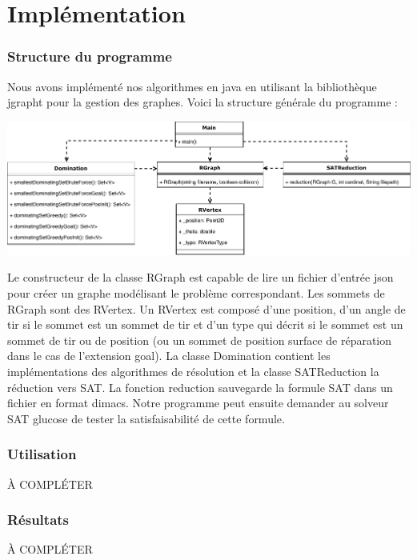 \part{Implémentation}

\section{Structure du programme}
Nous avons implémenté nos algorithmes en java en utilisant la bibliothèque jgrapht pour la gestion des graphes. Voici la structure générale du programme :\newline

\scalebox{0.7} {
\includegraphics{robotdef.pdf}
} \newline

Le constructeur de la classe RGraph est capable de lire un fichier d'entrée json pour créer un graphe modélisant le problème correspondant. Les sommets de RGraph sont des RVertex. Un RVertex est composé d'une position, d'un angle de tir si le sommet est un sommet de tir et d'un type qui décrit si le sommet est un sommet de tir ou de position (ou un sommet de position surface de réparation dans le cas de l'extension goal). La classe Domination contient les implémentations des algorithmes de résolution et la classe SATReduction la réduction vers SAT. La fonction reduction sauvegarde la formule SAT dans un fichier en format dimacs. Notre programme peut ensuite demander au solveur SAT glucose de tester la satisfaisabilité de cette formule.

\section{Utilisation}

À COMPLÉTER

\section{Résultats}

À COMPLÉTER